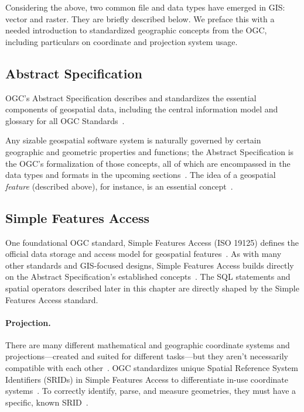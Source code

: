 Considering the above, two common file and data types have emerged in GIS: vector and raster. They are briefly described below. We preface this with a needed introduction to standardized geographic concepts from the OGC, including particulars on coordinate and projection system usage.

\subsection{Abstract Specification}
OGC's Abstract Specification describes and standardizes the essential components of geospatial data, including the central information model and glossary for all OGC Standards~\cite{AbstractSpecFaq}.

Any sizable geospatial software system is naturally governed by certain geographic and geometric properties and functions; the Abstract Specification is the OGC's formalization of those concepts, all of which are encompassed in the data types and formats in the upcoming sections~\cite{AbstractSpecFaq}. The idea of a geospatial \textit{feature} (described above), for instance, is an essential concept~\cite{Kottman2009,AbstractSpecFaq}.

\subsection{Simple Features Access}
One foundational OGC standard, Simple Features Access (ISO 19125) defines the official data storage and access model for geospatial features~\cite{SFA}. As with many other standards and GIS-focused designs, Simple Features Access builds directly on the Abstract Specification's established concepts~\cite{SFA,AbstractSpecFaq}. The SQL statements and spatial operators described later in this chapter are directly shaped by the Simple Features Access standard.

\paragraph{Projection.}
There are many different mathematical and geographic coordinate systems and projections---created and suited for different tasks---but they aren't necessarily compatible with each other~\cite{Kottman2009}. OGC standardizes unique Spatial Reference System Identifiers (SRIDs) in Simple Features Access to differentiate in-use coordinate systems~\cite{SFA}. To correctly identify, parse, and measure geometries, they must have a specific, known SRID~\cite{Kottman2009}.
  
